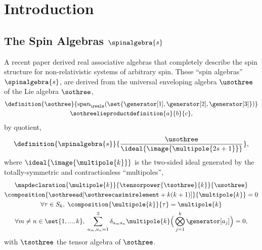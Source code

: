 \documentclass{article}
\begin{document}
\section{Introduction}

\subsection{The Spin Algebras \texorpdfstring{$\spinalgebra{s}$}{A(s)}}\label{sec:spin-algebras}

A recent paper\cite{bradshaw} derived real associative algebras that completely describe the spin structure for non-relativistic systems of arbitrary spin. These \enquote{spin algebras} $\spinalgebra{s}$, are derived from the universal enveloping algebra\cite{humphreys} $\usothree$ of the Lie algebra $\sothree$,
\begin{subequations}
\begin{gather}
    \definition{\sothree}{\textup{span}_{\reals}(\set{\generator[1],\generator[2],\generator[3]})}\\
    \sothreelieproductdefinition{a}{b}{c}\label{eqn:so3-lie-product},
\end{gather}
\end{subequations}
\noindent by quotient,
\begin{equation}\label{eqn:spin-algebra-definition}
    \definition{\spinalgebra{s}}{\frac{\usothree}{\ideal{\image{\multipole{2s+1}}}}},
\end{equation}
\noindent where $\ideal{\image{\multipole{k}}}$ is the two-sided ideal generated by the totally-symmetric and contractionless \enquote{multipoles},
\begin{subequations}
\begin{gather}
    \mapdeclaration{\multipole{k}}{\tensorpower{\tsothree}{k}}{\usothree}\\
    \composition{\sothreead[\sothreecasimirelement+k(k+1)]}{\multipole{k}}=0\label{eqn:multipole-eigenobject}\\
    \forall\tau\in S_k,\; \composition{\multipole{k}}{\tau}=\multipole{k}\\
    \forall m\neq n\in \set{1,...,k},\;\sum_{a_m,a_n=1}^{3}\delta_{a_m a_n}\multipole{k}\Big(\bigotimes_{j=1}^{k}\generator[a_j]\Big)=0,
\end{gather}
\end{subequations}
\noindent with $\tsothree$ the tensor algebra of $\sothree$\cite{bourbaki}.
\end{document}
